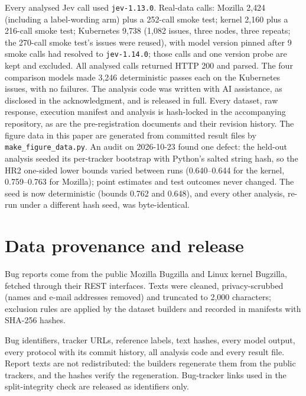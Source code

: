 Every analysed Jev call used \texttt{jev-1.13.0}. Real-data calls:
Mozilla 2{,}424 (including a label-wording arm) plus a 252-call smoke
test; kernel 2{,}160 plus a 216-call smoke test; Kubernetes 9{,}738
(1{,}082 issues, three nodes, three repeats; the 270-call smoke test's
issues were reused), with model version pinned after 9 smoke calls had
resolved to \texttt{jev-1.14.0}; those calls and one version probe are
kept and excluded. All analysed calls returned HTTP 200 and parsed. The
four comparison models made 3{,}246 deterministic passes each on the
Kubernetes issues, with no failures.
The analysis code was written with AI assistance, as disclosed in the
acknowledgment, and is released in full. Every dataset, raw response,
execution manifest and analysis is hash-locked in the accompanying
repository, as are the pre-registration
documents and their revision history. The figure data in this paper are
generated from committed result files by \texttt{make\_figure\_data.py}.
An audit on 2026-10-23 found one defect: the held-out analysis seeded its
per-tracker bootstrap with Python's salted string hash, so the HR2
one-sided lower bounds varied between runs (0.640--0.644 for the kernel,
0.759--0.763 for Mozilla); point estimates and test outcomes never changed.
The seed is now deterministic (bounds 0.762 and 0.648), and every other
analysis, re-run under a different hash seed, was byte-identical.

\section{Data provenance and release}

 Bug reports come from the public Mozilla Bugzilla and
Linux kernel Bugzilla, fetched through their REST interfaces. Texts were
cleaned, privacy-scrubbed (names and e-mail addresses removed) and
truncated to 2{,}000 characters; exclusion rules are applied by the
dataset builders and recorded in manifests with SHA-256 hashes.

 Bug identifiers, tracker URLs, reference labels,
text hashes, every model output, every protocol with its commit history,
all analysis code and every result file. Report texts are not
redistributed: the builders regenerate them from the public trackers, and
the hashes verify the regeneration. Bug-tracker links used in the
split-integrity check are released as identifiers only.


